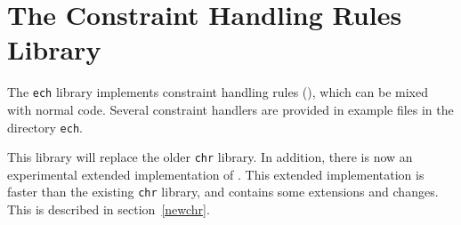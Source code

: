 %
% 
% 
% 
% 

%
%
%               

\newcommand{\OU}{$|$~}

\newcommand{\rep}{{\tt <=>}\ }
\newcommand{\aug}{{\tt ==>}\ }
\newcommand{\rul}{{\tt :-}\ }


\chapter{The Constraint Handling Rules Library}
\label{chapchr}


The {\tt ech} library implements constraint handling rules
 (\chrs),
which can be mixed with normal \eclipse code.
Several constraint handlers are
provided in example files in the directory {\tt ech}.

This library will replace the older {\tt chr} library. 
In addition, there is now an experimental extended implementation of {\chrs}. 
This extended implementation is faster than the existing {\tt chr} library,
and contains some extensions and changes. This is described in 
section~\ref{newchr}.

